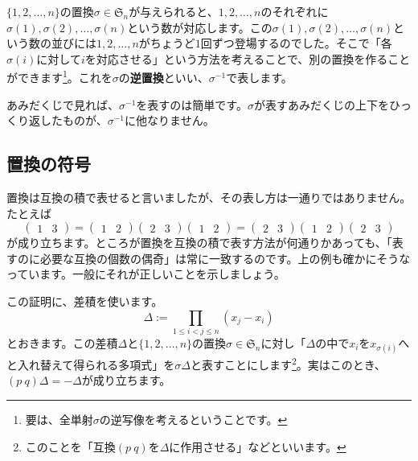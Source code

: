$\{1, 2, \ldots, n\}$の置換$\sigma \in \mathfrak{S}_n$が与えられると、$1, 2, \ldots, n$のそれぞれに$\sigma(1), \sigma(2), \ldots, \sigma(n)$という数が対応します。この$\sigma(1), \sigma(2), \ldots, \sigma(n)$という数の並びには$1, 2, \ldots, n$がちょうど$1$回ずつ登場するのでした。そこで「各$\sigma(i)$に対して$i$を対応させる」という方法を考えることで、別の置換を作ることができます\footnote{要は、全単射$\sigma$の逆写像を考えるということです。}。これを$\sigma$の\textbf{逆置換}といい、$\sigma^{-1}$で表します。

あみだくじで見れば、$\sigma^{-1}$を表すのは簡単です。$\sigma$が表すあみだくじの上下をひっくり返したものが、$\sigma^{-1}$に他なりません。

\subsection{置換の符号}

置換は互換の積で表せると言いましたが、その表し方は一通りではありません。たとえば
\[
\begin{pmatrix}
1 & 3
\end{pmatrix}
=
\begin{pmatrix}
1 & 2
\end{pmatrix}
\begin{pmatrix}
2 & 3
\end{pmatrix}
\begin{pmatrix}
1 & 2
\end{pmatrix}
=
\begin{pmatrix}
2 & 3
\end{pmatrix}
\begin{pmatrix}
1 & 2
\end{pmatrix}
\begin{pmatrix}
2 & 3
\end{pmatrix}
\]
が成り立ちます。ところが置換を互換の積で表す方法が何通りかあっても、「表すのに必要な互換の個数の偶奇」は常に一致するのです。上の例も確かにそうなっています。一般にそれが正しいことを示しましょう。


この証明に、差積を使います。
\[
\Delta := \prod_{1 \leq i  < j \leq n} (x_j - x_i)
\]
とおきます。この差積$\Delta$と$\{1, 2, \ldots, n\}$の置換$\sigma \in \mathfrak{S}_n$に対し「$\Delta$の中で$x_i$を$x_{\sigma(i)}$へと入れ替えて得られる多項式」を$\sigma\Delta$と表すことにします\footnote{このことを「互換$(p\ q)$を$\Delta$に作用させる」などといいます。}。実はこのとき、$(p\ q)\Delta = -\Delta$が成り立ちます。

